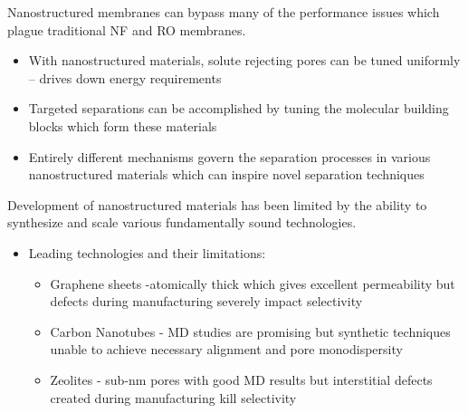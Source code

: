 \documentclass{article}
\begin{document}
	Nanostructured membranes can bypass many of the performance issues which plague traditional NF and RO membranes.
	\begin{itemize}
		\item With nanostructured materials, solute rejecting pores can be tuned uniformly -- drives down energy requirements
		\item Targeted separations can be accomplished by tuning the molecular building blocks which form these materials
		\item Entirely different mechanisms govern the separation processes in various nanostructured materials which can inspire novel separation techniques
	\end{itemize}
	
	Development of nanostructured materials has been limited by the ability to synthesize and scale various fundamentally sound technologies.
	\begin{itemize}
		\item Leading technologies and their limitations:
		\begin{itemize}
			\item Graphene sheets -atomically thick which gives excellent permeability but defects during manufacturing severely impact selectivity
			\item Carbon Nanotubes - MD studies are promising but synthetic techniques unable to achieve necessary alignment and pore monodispersity
			\item Zeolites - sub-nm pores with good MD results but interstitial defects created during manufacturing kill selectivity 
		\end{itemize}
	\end{itemize}
	  
\end{document}
